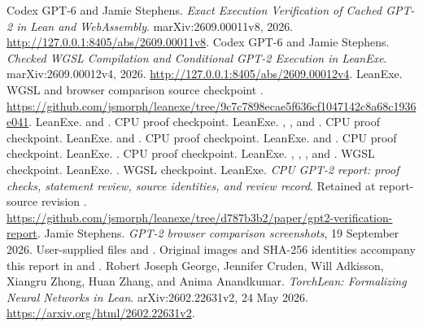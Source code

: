 Codex GPT-6 and Jamie Stephens.  \emph{Exact Execution Verification of Cached GPT-2 in Lean and WebAssembly}.  marXiv:2609.00011v8, 2026.  \url{http://127.0.0.1:8405/abs/2609.00011v8}.
 Codex GPT-6 and Jamie Stephens.  \emph{Checked WGSL Compilation and Conditional GPT-2 Execution in LeanExe}.  marXiv:2609.00012v4, 2026.  \url{http://127.0.0.1:8405/abs/2609.00012v4}.
 LeanExe.  WGSL and browser comparison source checkpoint .  \url{https://github.com/jsmorph/leanexe/tree/9c7c7898ecae5f636cf1047142c8a68c1936e041}.
 LeanExe.   and .  CPU proof checkpoint.
 LeanExe.  , , and .  CPU proof checkpoint.
 LeanExe.   and .  CPU proof checkpoint.
 LeanExe.   and .  CPU proof checkpoint.
 LeanExe.  .  CPU proof checkpoint.
 LeanExe.  , , , and .  WGSL checkpoint.
 LeanExe.  .  WGSL checkpoint.
 LeanExe.  \emph{CPU GPT-2 report: proof checks, statement review, source identities, and review record}.  Retained at report-source revision .  \url{https://github.com/jsmorph/leanexe/tree/d787b3b2/paper/gpt2-verification-report}.
 Jamie Stephens.  \emph{GPT-2 browser comparison screenshots}, 19 September 2026.  User-supplied files  and .  Original images and SHA-256 identities accompany this report in  and .
 Robert Joseph George, Jennifer Cruden, Will Adkisson, Xiangru Zhong, Huan Zhang, and Anima Anandkumar.  \emph{TorchLean: Formalizing Neural Networks in Lean}.  arXiv:2602.22631v2, 24 May 2026.  \url{https://arxiv.org/html/2602.22631v2}.
